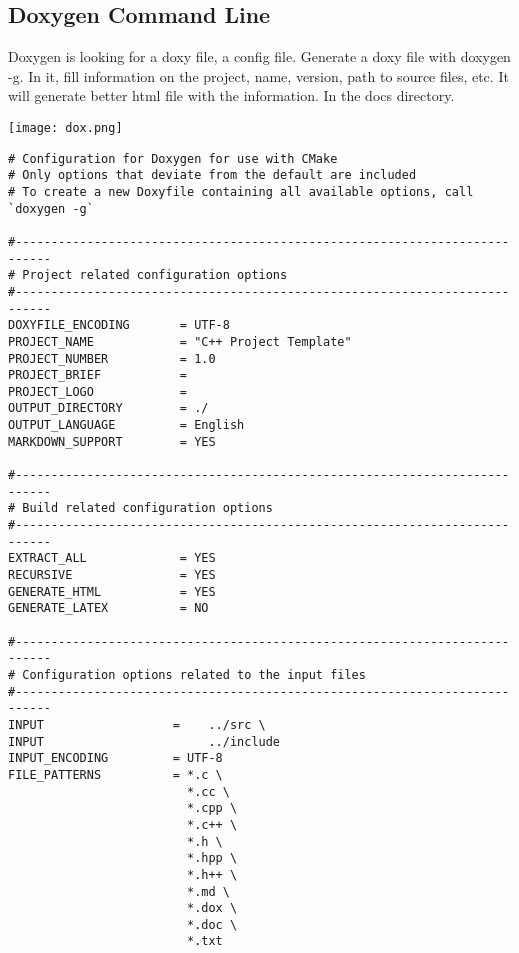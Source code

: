 \documentclass[openany]{report}
\begin{document}
\subsection{Doxygen Command Line}

Doxygen is looking for a doxy file, a config file. Generate a doxy file with doxygen -g.
In it, fill information on the project, name, version,  path to source files, etc. It will generate better html file with the information.
In the docs directory.

\begin{center}
    \texttt{[image: dox.png]}
\end{center}

\begin{verbatim}
# Configuration for Doxygen for use with CMake
# Only options that deviate from the default are included
# To create a new Doxyfile containing all available options, call `doxygen -g`

#---------------------------------------------------------------------------
# Project related configuration options
#---------------------------------------------------------------------------
DOXYFILE_ENCODING       = UTF-8
PROJECT_NAME            = "C++ Project Template"
PROJECT_NUMBER          = 1.0
PROJECT_BRIEF           =
PROJECT_LOGO            =
OUTPUT_DIRECTORY        = ./
OUTPUT_LANGUAGE         = English
MARKDOWN_SUPPORT        = YES

#---------------------------------------------------------------------------
# Build related configuration options
#---------------------------------------------------------------------------
EXTRACT_ALL             = YES
RECURSIVE               = YES
GENERATE_HTML           = YES
GENERATE_LATEX          = NO

#---------------------------------------------------------------------------
# Configuration options related to the input files
#---------------------------------------------------------------------------
INPUT                  =    ../src \
INPUT                       ../include
INPUT_ENCODING         = UTF-8
FILE_PATTERNS          = *.c \
                         *.cc \
                         *.cpp \
                         *.c++ \
                         *.h \
                         *.hpp \
                         *.h++ \
                         *.md \
                         *.dox \
                         *.doc \
                         *.txt
\end{verbatim}
\end{document}
